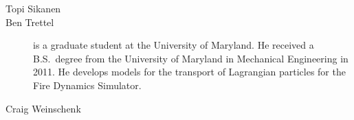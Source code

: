 \begin{description}
\item[Topi Sikanen]

\item[Ben Trettel] is a graduate student at the University of Maryland. He received a B.S.\ degree from the University of Maryland in Mechanical Engineering in 2011. He develops models for the transport of Lagrangian particles for the Fire Dynamics Simulator.

\item[Craig Weinschenk]

\end{description}



